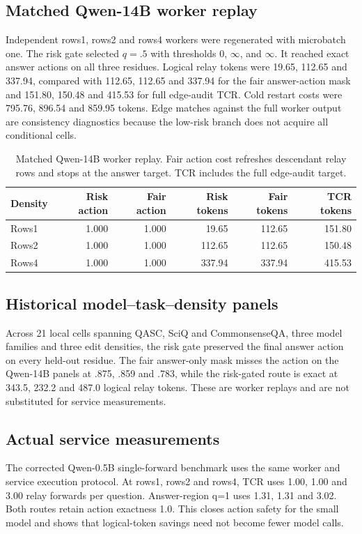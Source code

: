 \documentclass[11pt]{article}
\begin{document}
\subsection{Matched Qwen-14B worker replay}
Independent rows1, rows2 and rows4 workers were regenerated with microbatch one. The risk gate selected $q=.5$ with thresholds 0, $\infty$, and $\infty$. It reached exact answer actions on all three residues. Logical relay tokens were 19.65, 112.65 and 337.94, compared with 112.65, 112.65 and 337.94 for the fair answer-action mask and 151.80, 150.48 and 415.53 for full edge-audit TCR. Cold restart costs were 795.76, 896.54 and 859.95 tokens. Edge matches against the full worker output are consistency diagnostics because the low-risk branch does not acquire all conditional cells.

\begin{table}[t]
\centering\small
\begin{tabular}{lrrrrr}
\toprule
Density & Risk action & Fair action & Risk tokens & Fair tokens & TCR tokens\\
\midrule
Rows1 & 1.000 & 1.000 & 19.65 & 112.65 & 151.80\\
Rows2 & 1.000 & 1.000 & 112.65 & 112.65 & 150.48\\
Rows4 & 1.000 & 1.000 & 337.94 & 337.94 & 415.53\\
\bottomrule
\end{tabular}
\caption{Matched Qwen-14B worker replay. Fair action cost refreshes descendant relay rows and stops at the answer target. TCR includes the full edge-audit target.}
\end{table}

\subsection{Historical model--task--density panels}
Across 21 local cells spanning QASC, SciQ and CommonsenseQA, three model families and three edit densities, the risk gate preserved the final answer action on every held-out residue. The fair answer-only mask misses the action on the Qwen-14B panels at .875, .859 and .783, while the risk-gated route is exact at 343.5, 232.2 and 487.0 logical relay tokens. These are worker replays and are not substituted for service measurements.

\subsection{Actual service measurements}
The corrected Qwen-0.5B single-forward benchmark uses the same worker and service execution protocol. At rows1, rows2 and rows4, TCR uses 1.00, 1.00 and 3.00 relay forwards per question. Answer-region q=1 uses 1.31, 1.31 and 3.02. Both routes retain action exactness 1.0. This closes action safety for the small model and shows that logical-token savings need not become fewer model calls.
\end{document}
